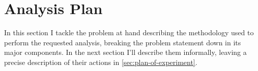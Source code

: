 \documentclass[10pt,a4paper]{article}
\begin{document}
\title{\rmfamily\normalfont{}} \author{\\} \date{\today}
    
    \maketitle

    \begin{abstract}
      This short article collects the work I did in order to support
      my Quantitative Systems Analysis exam. The goal is to study
      resources usage respect a collection of user profiles, each of
      them catch a way of using some applications of interest in
      different time windows. I performed some experiments collecting
      results in a OLAP ``star''-like relational schema in order to
      provide summaries for dimensions under study, such as bandwidth
      usage, network activity, CPU and memory consumption.
    \end{abstract}
       
    \tableofcontents
   

 
    \newpage
    \section{Analysis Plan}
    In this section I tackle the problem at hand describing the
    methodology used to perform the requested analysis, breaking the
    problem statement down in its major components. In the next
    section I'll describe them informally, leaving a precise
    description of their actions in \autoref{sec:plan-of-experiment}.
\end{document}
